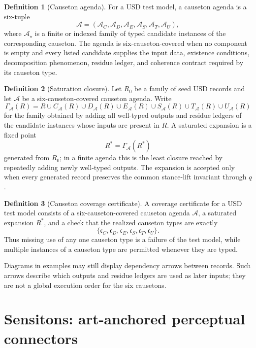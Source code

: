 \documentclass[11pt]{article}
\theoremstyle{definition}
\newtheorem{definition}{Definition}[section]
\theoremstyle{plain}
\begin{document}
\begin{definition}[Causeton agenda]
For a USD test model, a causeton agenda is a six-tuple
\[
  \mathcal A
  =
  (\mathcal A_C,\mathcal A_D,\mathcal A_E,
   \mathcal A_S,\mathcal A_T,\mathcal A_U),
\]
where $\mathcal A_\star$ is a finite or indexed family of typed candidate
instances of the corresponding causeton.  The agenda is
six-causeton-covered when no component is empty and every listed candidate
supplies the input data,
existence conditions, decomposition phenomenon, residue ledger, and
coherence contract required by its causeton type.
\end{definition}

\begin{definition}[Saturation closure]
Let $R_0$ be a family of seed USD records and let $\mathcal A$ be a
six-causeton-covered causeton agenda.  Write
\[
  \Gamma_{\mathcal A}(R)
  =
  R\cup C_{\mathcal A}(R)\cup D_{\mathcal A}(R)
   \cup E_{\mathcal A}(R)\cup S_{\mathcal A}(R)
   \cup T_{\mathcal A}(R)\cup U_{\mathcal A}(R)
\]
for the family obtained by adding all well-typed outputs and residue
ledgers of the candidate instances whose inputs are present in $R$.  A
saturated expansion is a fixed point
\[
  R^*=\Gamma_{\mathcal A}(R^*)
\]
generated from $R_0$; in a finite agenda this is the least closure reached
by repeatedly adding newly well-typed outputs.  The expansion is accepted
only when every generated record preserves the common stance-lift
invariant through $q$.
\end{definition}

\begin{definition}[Causeton coverage certificate]
A coverage certificate for a USD test model consists of a
six-causeton-covered causeton agenda $\mathcal A$, a saturated expansion
$R^*$, and a check that the realized causeton types are exactly
\[
  \{\mathfrak c_C,\mathfrak c_D,\mathfrak c_E,
    \mathfrak c_S,\mathfrak c_T,\mathfrak c_U\}.
\]
Thus missing use of any one causeton type is a failure of the test model,
while multiple instances of a causeton type are permitted whenever they are
typed.
\end{definition}

Diagrams in examples may still display dependency arrows between records.
Such arrows describe which outputs and residue ledgers are used as later
inputs; they are not a global execution order for the six causetons.

\section{Sensitons: art-anchored perceptual connectors}
\end{document}
